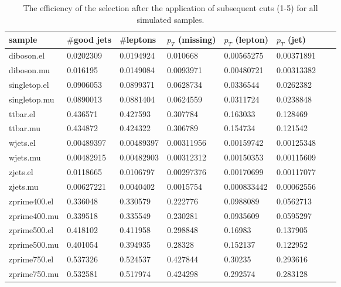 
  \begin{table}[H]
    \centering
    \caption{The efficiency of the selection after the application of subsequent cuts (1-5) for all simulated samples.}
    \begin{tabular}{l|lllllll}
    sample             & $\#$good jets & $\#$leptons & $p_T$ (missing) &  $p_T$ (lepton)    & $p_T$ (jet)   \\
    \hline
      diboson.el    & 0.0202309  & 0.0194924  & 0.010668   & 0.00565275  & 0.00371891  \\
      diboson.mu    & 0.016195   & 0.0149084  & 0.0093971  & 0.00480721  & 0.00313382  \\
      singletop.el  & 0.0906053  & 0.0899371  & 0.0628734  & 0.0336544   & 0.0262382   \\
      singletop.mu  & 0.0890013  & 0.0881404  & 0.0624559  & 0.0311724   & 0.0238848   \\
      ttbar.el      & 0.436571   & 0.427593   & 0.307784   & 0.163033    & 0.128469    \\
      ttbar.mu      & 0.434872   & 0.424322   & 0.306789   & 0.154734    & 0.121542    \\
      wjets.el      & 0.00489397 & 0.00489397 & 0.00311956 & 0.00159742  & 0.00125348  \\
      wjets.mu      & 0.00482915 & 0.00482903 & 0.00312312 & 0.00150353  & 0.00115609  \\
      zjets.el      & 0.0118665  & 0.0106797  & 0.00297376 & 0.00170699  & 0.00117077  \\
      zjets.mu      & 0.00627221 & 0.0040402  & 0.0015754  & 0.000833442 & 0.00062556  \\
      zprime400.el  & 0.336048   & 0.330579   & 0.222776   & 0.0988089   & 0.0562713   \\
      zprime400.mu  & 0.339518   & 0.335549   & 0.230281   & 0.0935609   & 0.0595297   \\
      zprime500.el  & 0.418102   & 0.411958   & 0.298848   & 0.16983     & 0.137905    \\
      zprime500.mu  & 0.401054   & 0.394935   & 0.28328    & 0.152137    & 0.122952    \\
      zprime750.el  & 0.537326   & 0.524537   & 0.427844   & 0.30235     & 0.293616    \\
      zprime750.mu  & 0.532581   & 0.517974   & 0.424298   & 0.292574    & 0.283128    \\

\end{tabular}
\end{table}
